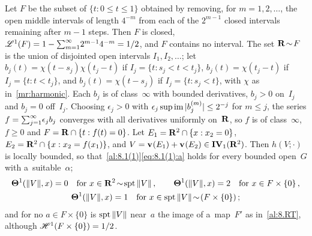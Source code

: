 \begin{example}
    \label{al:8.1(2)}
    Let $F$ be the subset of $\{ t : 0 \le t \le 1 \}$ obtained by removing, for $m = 1, 2,
    \ldots$, the open middle intervals of length $4^{-m}$ from each of the $2^{m-1}$ closed intervals
    remaining after $m - 1$ steps. Then $F$ is closed, $\mathscr{L}^1(F) = 1 - {\textstyle\sum_{m=1}^{\infty}} 2^{m-1}
    4^{-m} = 1/2$, and $F$ contains no interval. The set $\mathbf{R} \!\sim\! F$ is the union of
    disjointed open intervals $I_1, I_2, \ldots$; let $b_j(t) = \chi(t - s_j) \chi(t_j - t)$ if $I_j
    = \{ t : s_j < t < t_j \}$, $b_j(t) = \chi(t_j - t)$ if $I_j = \{ t : t < t_j \}$, and $b_j(t) =
    \chi(t - s_j)$ if $I_j = \{ t : s_j < t \}$, with $\chi$ as in~\ref{mr:harmonic}. Each $b_j$ is
    of class~$\infty$ with bounded derivatives, $b_j > 0$ on~$I_j$ and $b_j = 0$ off~$I_j$. Choosing
    $\epsilon_j > 0$ with $\epsilon_j \sup \operatorname{im} |b_j^{(m)}| \le 2^{-j}$ for $m \le j$, the series $f
    = {\textstyle\sum_{j=1}^{\infty}} \epsilon_j b_j$ converges with all derivatives uniformly on~$\mathbf{R}$, so $f$
    is of class~$\infty$, $f \ge 0$ and $F = \mathbf{R} \cap \{ t : f(t) = 0 \}$. Let $E_1 = \mathbf{R}^2 \cap \{ x :
    x_2 = 0 \}$, $E_2 = \mathbf{R}^2 \cap \{ x : x_2 = f(x_1) \}$, and $V = \mathbf{v}_{}(E_1) + \mathbf{v}_{}(E_2) \in
    \mathbf{IV}_{1}(\mathbf{R}^2)$. Then $h(V;\cdot)$ is locally bounded, so that~\ref{al:8.1(1)}\eqref{eq:8.1(1):a}
    holds for every bounded open~$G$ with a~suitable~$\alpha$;
    \begin{gather*}
        \boldsymbol{\Theta}^1(\|V\|,x) = 0 \quad \text{for $x \in \mathbf{R}^2 \!\sim\! \operatorname{spt} \|V\|$} \,, \qquad
        \boldsymbol{\Theta}^1(\|V\|,x) = 2 \quad \text{for $x \in F \times \{0\}$} \,, \\
        \boldsymbol{\Theta}^1(\|V\|,x) = 1 \quad \text{for $x \in \operatorname{spt} \|V\| \!\sim\! (F \times \{0\})$} \,;
    \end{gather*}
    and for no $a \in F \times \{0\}$ is $\operatorname{spt} \|V\|$ near~$a$ the image of a~map~$F'$ as
    in~\ref{al:8.RT}, although $\mathscr{H}^1(F \times \{0\}) = 1/2$.
\end{example}

